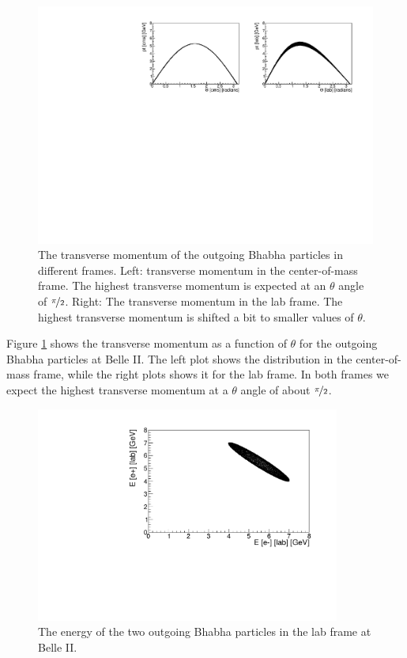 \documentclass[a4paper,11pt,twosided,final,german,openbib,pdftex,listof=totoc,bibliography=totoc]{scrbook}
\begin{document}
\begin{figure}[h!]
	\centering
\includegraphics[width=\textwidth]{Bilder/CptTheta}
	\caption[$\theta$-Transverse Momentum-Distribution In The CMS And LAB Frame]{The transverse momentum of the outgoing Bhabha particles in different frames. Left: transverse momentum in the center-of-mass frame. The highest transverse momentum is expected at an $\theta$ angle of $\nicefrac{\pi}{2}$.  Right: The transverse momentum in the lab frame. The highest transverse momentum is shifted a bit to smaller values of $\theta$.}
	\label{fig:Belle IItMomentum}
\end{figure}


Figure \ref{fig:Belle IItMomentum} shows the transverse momentum as a function of $\theta$ for the outgoing Bhabha particles at Belle II. The left plot shows the distribution in the center-of-mass frame, while the right plots shows it for the lab frame. In both frames we expect the highest transverse momentum at a $\theta$ angle of about $\nicefrac{\pi}{2}$.



\begin{figure}[h!]
	\centering
	\includegraphics[width=10cm]{Bilder/ee}
	\caption[Energies Of The Outgoing Particle In The LAB Frame]{The energy of the two outgoing Bhabha particles in the lab frame at Belle II.}
	\label{fig:EvsE}
\end{figure}
\end{document}
